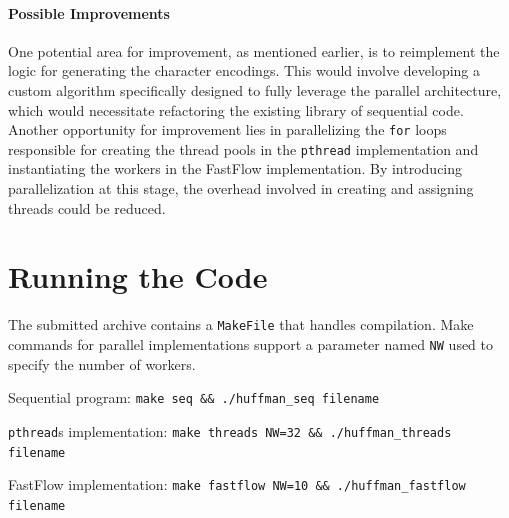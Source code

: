 \documentclass[10pt]{article}
\begin{document}
\paragraph{Possible Improvements} One potential area for improvement, as mentioned earlier, is to reimplement the logic for generating the character encodings. This would involve developing a custom algorithm specifically designed to fully leverage the parallel architecture, which would necessitate refactoring the existing library of sequential code.\\
Another opportunity for improvement lies in parallelizing the \texttt{for} loops responsible for creating the thread pools in the \texttt{pthread} implementation and instantiating the workers in the FastFlow implementation. By introducing parallelization at this stage, the overhead involved in creating and assigning threads could be reduced.
\section{Running the Code} 
The submitted archive contains a \texttt{MakeFile} that handles compilation. Make commands for parallel implementations support a parameter named \texttt{NW} used to specify the number of workers.
\begin{list}{}{}
	\item Sequential program: \texttt{make seq \&\& ./huffman\_seq filename}
	\item \texttt{pthread}s implementation: \texttt{make threads NW=32 \&\& ./huffman\_threads filename}
	\item FastFlow implementation: \texttt{make fastflow NW=10 \&\& ./huffman\_fastflow filename}
\end{list}
\end{document}
